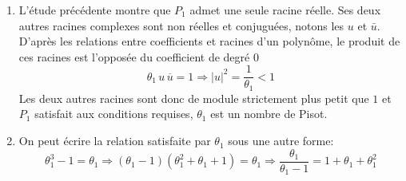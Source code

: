 \begin{enumerate}
\begin{enumerate}
 \item L'étude précédente montre que $P_1$ admet une seule racine réelle. Ses deux autres racines complexes sont non réelles et conjuguées, notons les $u$ et $\bar{u}$. D'après les relations entre coefficients et racines d'un polynôme, le produit de ces racines est l'opposée du coefficient de degré $0$
\begin{displaymath}
 \theta_1 \,u\, \overline{u} =1 \Rightarrow |u|^2 = \frac{1}{\theta_1}<1
\end{displaymath}
Les deux autres racines sont donc de module strictement plus petit que $1$ et $P_1$ satisfait aux conditions requises, $\theta_1$ est un nombre de Pisot.
 \item On peut écrire la relation satisfaite par $\theta_1$ sous une autre forme:
\begin{displaymath}
 \theta_1^3 -1 = \theta_1 \Rightarrow(\theta_1-1)(\theta_1^2+\theta_1+1)=\theta_1
\Rightarrow \frac{\theta_1}{\theta_1 -1}=1+\theta_1+\theta_1^2
\end{displaymath}
\end{enumerate}


\end{enumerate}
